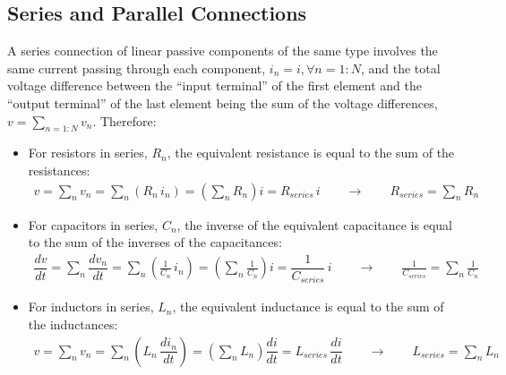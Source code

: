 \documentclass[letterpaper,10pt,english]{jupyterBook}
\begin{document}
\subsection{Series and Parallel Connections}
\label{\detokenize{ch/circuits-electric-elementary-connections:series-and-parallel-connections}}\label{\detokenize{ch/circuits-electric-elementary-connections:physics-hs-electromagnetism-circuits-electric-components-configurations-series-parallel}}
\sphinxAtStartPar
{} A series connection of linear passive components of the same type involves the same current passing through each component, \(i_n = i, \forall n=1:N\), and the total voltage difference between the “input terminal” of the first element and the “output terminal” of the last element being the sum of the voltage differences, \(v = \sum_{n=1:N} v_n\). Therefore:
\begin{itemize}
\item {} 
\sphinxAtStartPar
For resistors in series, \(R_n\), the equivalent resistance is equal to the sum of the resistances:
\begin{equation*}
\begin{split}v = \sum_n v_n = \sum_n \left( R_n \, i_n \right) = \left( \sum_n R_n \right) i = R_{series} \, i \qquad \rightarrow \qquad R_{series} = \sum_n R_n\end{split}
\end{equation*}
\item {} 
\sphinxAtStartPar
For capacitors in series, \(C_n\), the inverse of the equivalent capacitance is equal to the sum of the inverses of the capacitances:
\begin{equation*}
\begin{split}\dfrac{d v}{dt} = \sum_n \dfrac{d v_n}{dt} = \sum_n \left( \frac{1}{C_n} \, i_n \right) = \left( \sum_n \frac{1}{C_n} \right) i = \dfrac{1}{C_{series}} \, i \qquad \rightarrow \qquad \frac{1}{C_{series}} = \sum_n \frac{1}{C_n}\end{split}
\end{equation*}
\item {} 
\sphinxAtStartPar
For inductors in series, \(L_n\), the equivalent inductance is equal to the sum of the inductances:
\begin{equation*}
\begin{split}v = \sum_n v_n = \sum_n \left( L_n \, \dfrac{d i_n}{d t} \right) = \left( \sum_n L_n \right) \dfrac{d i}{dt} = L_{series} \, \dfrac{d i}{dt} \qquad \rightarrow \qquad L_{series} = \sum_n L_n\end{split}
\end{equation*}
\end{itemize}
\end{document}
